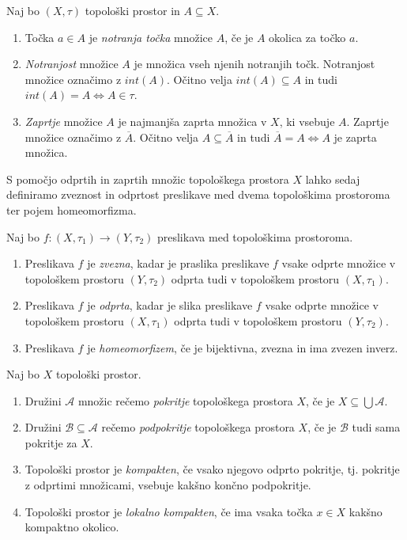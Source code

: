 \documentclass[mat1]{fmfdelo}
\newcommand{\closure}[1]{\overline{#1}}
\begin{document}
\begin{definicija}\label{def:notranjost}
Naj bo $(X, \tau)$ topološki prostor in $A \subseteq X$.
\begin{enumerate}
\item Točka $a \in A$ je \emph{notranja točka} množice $A$, če je $A$ okolica za točko $a$.
\item \emph{Notranjost} množice $A$ je množica vseh njenih notranjih točk. Notranjost množice označimo z $int(A)$. Očitno velja $int(A) \subseteq A$ in tudi $int(A) = A \iff A \in \tau$.
\item \emph{Zaprtje} množice $A$ je najmanjša zaprta množica v $X$, ki vsebuje $A$. Zaprtje množice označimo z $\closure{A}$. Očitno velja $A \subseteq \closure{A}$ in tudi $\closure{A} = A \iff A$ je zaprta množica.
\end{enumerate}
\end{definicija}

S pomočjo odprtih in zaprtih množic topološkega prostora $X$ lahko sedaj definiramo zveznost in odprtost preslikave med dvema topološkima prostoroma ter pojem homeomorfizma.

\begin{definicija}\label{def:toppreslikave}
Naj bo $f: (X, \tau_1) \to (Y, \tau_2)$ preslikava med topološkima prostoroma.
\begin{enumerate}
\item Preslikava $f$ je \emph{zvezna}, kadar je praslika preslikave $f$ vsake odprte množice v topološkem prostoru $(Y, \tau_2)$ odprta tudi v topološkem prostoru $(X, \tau_1)$.
\item Preslikava $f$ je \emph{odprta}, kadar je slika preslikave $f$ vsake odprte množice v topološkem prostoru $(X, \tau_1)$ odprta tudi v topološkem prostoru $(Y, \tau_2)$.
\item Preslikava $f$ je \emph{homeomorfizem}, če je bijektivna, zvezna in ima zvezen inverz.
\end{enumerate}
\end{definicija}


\begin{definicija}\label{def:kompakt}
Naj bo $X$ topološki prostor.
\begin{enumerate}
\item Družini $\mathcal{A}$ množic rečemo \emph{pokritje} topološkega prostora $X$, če je $X \subseteq \bigcup \mathcal{A}$.
\item Družini $\mathcal{B} \subseteq \mathcal{A}$ rečemo \emph{podpokritje} topološkega prostora $X$, če je $\mathcal{B}$ tudi sama pokritje za $X$.
\item Topološki prostor je \emph{kompakten}, če vsako njegovo odprto pokritje, tj. pokritje z odprtimi množicami, vsebuje kakšno končno podpokritje.
\item Topološki prostor je \emph{lokalno kompakten}, če ima vsaka točka $x \in X$ kakšno kompaktno okolico.
\end{enumerate}
\end{definicija}
\end{document}
